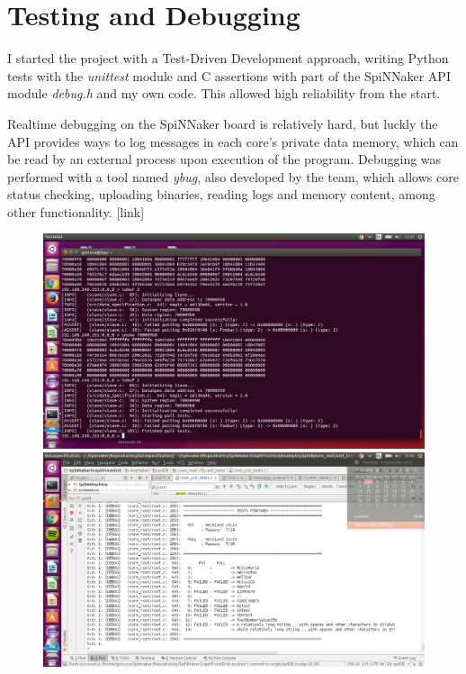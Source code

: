 \section{Testing and Debugging}
I started the project with a Test-Driven Development approach, writing Python tests with the \textit{unittest} module and C assertions with part of the SpiNNaker API module \textit{debug.h} and my own code. This allowed high reliability from the start.

Realtime debugging on the SpiNNaker board is relatively hard, but luckly the API provides ways to log messages in each core's private data memory, which can be read by an external process upon execution of the program. Debugging was performed with a tool named \textit{ybug}, also developed by the team, which allows core status checking, uploading binaries, reading logs and memory content, among other functionality.\cite{ybug} [link]

\begin{figure}
  \centering
  \includegraphics[width=1.3\linewidth, natwidth=1366, natheight=768]{images/debugging.png}
  \label{fig:debugging}
  \centering
  \includegraphics[width=1.3\linewidth, natwidth=1366, natheight=768]{images/testing.png}
  \label{fig:testing}
\end{figure}




